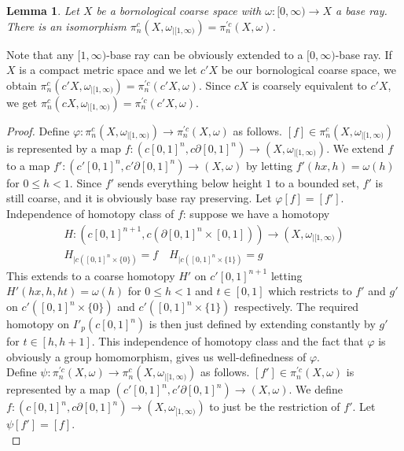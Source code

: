 \documentclass[a4paper,11pt]{article}
\theoremstyle{definition}
\theoremstyle{plain}
\newtheorem{lemma}[definition]{Lemma}
\theoremstyle{remark}
\begin{document}
{\begin{lemma} Let $X$ be a bornological coarse space with $\omega: [0,\infty)\rightarrow X$ a base ray. There is an isomorphism $\pi_{n}^{c}(X,\omega_{|[1,\infty)}) = \pi_{n}^{'c}(X,\omega)$. 
\end{lemma}

Note that any $[1,\infty)$-base ray can be obviously extended to a $[0,\infty)$-base ray. If $X$ is a compact metric space and we let $c'X$ be our bornological coarse space, we obtain $\pi_{n}^{c}(c'X,\omega_{|[1,\infty)}) = \pi_{n}^{'c}(c'X,\omega)$. Since $cX$ is coarsely equivalent to $c'X$, we get $\pi_{n}^{c}(cX,\omega_{|[1,\infty)}) = \pi_{n}^{'c}(c'X,\omega)$. 



\begin{proof} Define $\varphi: \pi_{n}^{c}(X,\omega_{|[1,\infty)})\rightarrow \pi_{n}^{'c}(X,\omega)$ as follows. $[f]\in \pi_{n}^{c}(X,\omega_{|[1,\infty)})$ is represented by a map $f: (c[0,1]^n,c\partial [0,1]^n)\rightarrow (X,\omega_{|[1,\infty)})$. We extend $f$ to a map $f':(c'[0,1]^{n},c'\partial [0,1]^n)\rightarrow (X,\omega)$ by letting $f'(hx,h)=\omega(h)$ for $0\leq h<1$. Since $f'$ sends everything below height $1$ to a bounded set, $f'$ is still coarse, and it is obviously base ray preserving. Let $\varphi[f]=[f']$.\\

Independence of homotopy class of $f$: suppose we have a homotopy 
\begin{align*}
H: (c[0,1]^{n+1},c(\partial [0,1]^n \times [0,1]))\rightarrow (X,\omega_{|[1,\infty)})\\
H_{|c([0,1]^n \times \{0\})} = f \quad H_{|c([0,1]^n \times \{1\})} = g
\end{align*} 
This extends to a coarse homotopy $H'$ on $c'[0,1]^{n+1}$ letting ${H'}(hx,h,ht) = \omega(h)$ for $0\leq h<1$ and $t\in [0,1]$ which restricts to $f'$ and $g'$ on $c'([0,1]^n \times \{0\})$ and $c'([0,1]^n \times \{1\})$ respectively. The required homotopy on $I'_{p}(c[0,1]^n)$ is then just defined by extending constantly by $g'$ for $t\in [h,h+1]$. This independence of homotopy class and the fact that $\varphi$ is obviously a group homomorphism, gives us well-definedness of $\varphi$.\\

Define $\psi:\pi_{n}^{'c}(X,\omega) \rightarrow \pi_{n}^{c}(X,\omega_{|[1,\infty)})$ as follows. $[f']\in \pi_{n}^{'c}(X,\omega)$ is represented by a map $(c'[0,1]^n,c'\partial [0,1]^n)\rightarrow (X,\omega)$. We define $f: (c[0,1]^n,c\partial[0,1]^n)\rightarrow(X,\omega_{[1,\infty)})$ to just be the restriction of $f'$. Let $\psi[f']=[f]$. \\


\end{proof}}
\end{document}
